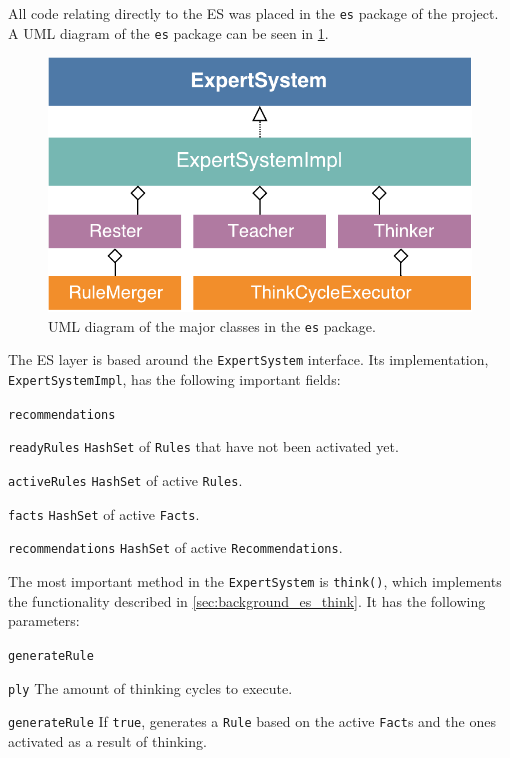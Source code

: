 \documentclass[titlepage,11pt]{article}
\newcommand{\code}[1]{\texttt{#1}}
\begin{document}
All code relating directly to the ES was placed in the \code{es} package of the project. A UML diagram of the \code{es} package can be seen in \cref{fig:uml_es}.

\begin{figure}[!htb]
	\includegraphics[width=\columnwidth]{figures/uml_es.pdf}
	\caption{UML diagram of the major classes in the \code{es} package.}
	\label{fig:uml_es}
\end{figure}

The ES layer is based around the \code{ExpertSystem} interface. Its implementation, \code{ExpertSystemImpl}, has the following important fields:

\begin{labeling}{\code{recommendations}}
	\item[\code{readyRules}] \code{HashSet} of \code{Rules} that have not been activated yet.
	\item[\code{activeRules}] \code{HashSet} of active \code{Rules}.
	\item[\code{facts}] \code{HashSet} of active \code{Facts}.
	\item[\code{recommendations}] \code{HashSet} of active \code{Recommendations}.
\end{labeling}

The most important method in the \code{ExpertSystem} is \code{think()}, which implements the functionality described in \cref{sec:background_es_think}. It has the following parameters:

\begin{labeling}{\code{generateRule}}
	\item[\code{ply}] The amount of thinking cycles to execute.
	\item[\code{generateRule}] If \code{true}, generates a \code{Rule} based on the active \code{Fact}s and the ones activated as a result of thinking.
\end{labeling}
\end{document}

